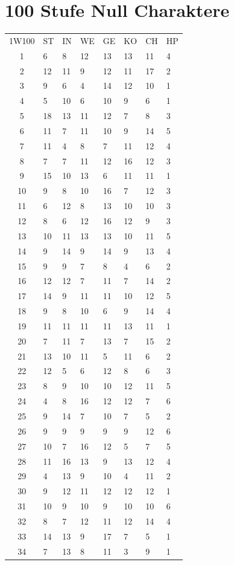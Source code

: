 \documentclass[11pt]{wbzine}
\begin{document}
\section{100 Stufe Null Charaktere}
\label{100char}

\begin{tabularx}{\textwidth}{cYYYYYYY}
1W100 & ST & IN & WE & GE & KO & CH & HP \\
   1 &  6  &  8  &  12  &  13  &  13  &  11   &  4 \\ 
   2  & 12 & 11 & 9 & 12 & 11 & 17 & 2 \\
    3 & 9 & 6 & 4 & 14 & 12 & 10 & 1 \\
    4 & 5 & 10 & 6 & 10 & 9 & 6 & 1 \\
    5 & 18 & 13 & 11 & 12 & 7 & 8 & 3 \\ 
    6 & 11 & 7 & 11 & 10 & 9 & 14 & 5 \\
    7 & 11 & 4 & 8 & 7 & 11 & 12 & 4 \\
    8 & 7 & 7 & 11 & 12 & 16 & 12 & 3 \\ 
    9 & 15 & 10 & 13 & 6 & 11 & 11 & 1 \\
    10 & 9 & 8 & 10 & 16 & 7 & 12 & 3 \\ 
    11 & 6 & 12 & 8 & 13 & 10 & 10 & 3 \\
    12 & 8 & 6 & 12 & 16 & 12 & 9 & 3 \\ 
    13 & 10 & 11 & 13 & 13 & 10 & 11 & 5 \\
    14 & 9 & 14 & 9 & 14 & 9 & 13 & 4 \\ 
    15 & 9 & 9 & 7 & 8 & 4 & 6 & 2 \\ 
    16 & 12 & 12 & 7 & 11 & 7 & 14 & 2 \\ 
    17 & 14 & 9 & 11 & 11 & 10 & 12 & 5 \\ 
    18 & 9 & 8 & 10 & 6 & 9 & 14 & 4 \\
    19 & 11 & 11 & 11 & 11 & 13 & 11 & 1 \\ 
    20 & 7 & 11 & 7 & 13 & 7 & 15 & 2 \\ 
    21 & 13 & 10 & 11 & 5 & 11 & 6 & 2 \\
    22 & 12 & 5 & 6 & 12 & 8 & 6 & 3 \\ 
    23 & 8 & 9 & 10 & 10 & 12 & 11 & 5 \\
    24 & 4 & 8 & 16 & 12 & 12 & 7 & 6 \\
    25 & 9 & 14 & 7 & 10 & 7 & 5 & 2 \\
    26 & 9 & 9 & 9 & 9 & 9 & 12 & 6 \\ 
    27 & 10 & 7 & 16 & 12 & 5 & 7 & 5 \\ 
    28 & 11 & 16 & 13 & 9 & 13 & 12 & 4 \\ 
    29 & 4 & 13 & 9 & 10 & 4 & 11 & 2 \\ 
    30 & 9 & 12 & 11 & 12 & 12 & 12 & 1 \\ 
    31 & 10 & 9 & 10 & 9 & 10 & 10 & 6 \\
    32 & 8 & 7 & 12 & 11 & 12 & 14 & 4 \\ 
    33 & 14 & 13 & 9 & 17 & 7 & 5 & 1 \\ 
    34 & 7 & 13 & 8 & 11 & 3 & 9 & 1 \\ 
\end{tabularx}
\end{document}
